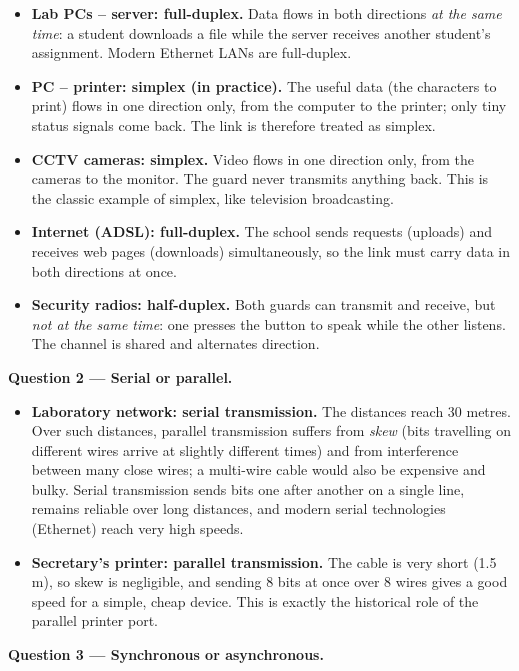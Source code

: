 \documentclass[11pt]{article}
\begin{document}
\begin{itemize}
\item \textbf{Lab PCs -- server: full-duplex.} Data flows in both directions \emph{at the same time}: a student downloads a file while the server receives another student's assignment. Modern Ethernet LANs are full-duplex.
\item \textbf{PC -- printer: simplex (in practice).} The useful data (the characters to print) flows in one direction only, from the computer to the printer; only tiny status signals come back. The link is therefore treated as simplex.
\item \textbf{CCTV cameras: simplex.} Video flows in one direction only, from the cameras to the monitor. The guard never transmits anything back. This is the classic example of simplex, like television broadcasting.
\item \textbf{Internet (ADSL): full-duplex.} The school sends requests (uploads) and receives web pages (downloads) simultaneously, so the link must carry data in both directions at once.
\item \textbf{Security radios: half-duplex.} Both guards can transmit and receive, but \emph{not at the same time}: one presses the button to speak while the other listens. The channel is shared and alternates direction.
\end{itemize}

\textbf{Question 2 — Serial or parallel.}

\begin{itemize}
\item \textbf{Laboratory network: serial transmission.} The distances reach 30 metres. Over such distances, parallel transmission suffers from \emph{skew} (bits travelling on different wires arrive at slightly different times) and from interference between many close wires; a multi-wire cable would also be expensive and bulky. Serial transmission sends bits one after another on a single line, remains reliable over long distances, and modern serial technologies (Ethernet) reach very high speeds.
\item \textbf{Secretary's printer: parallel transmission.} The cable is very short (1.5 m), so skew is negligible, and sending 8 bits at once over 8 wires gives a good speed for a simple, cheap device. This is exactly the historical role of the parallel printer port.
\end{itemize}

\textbf{Question 3 — Synchronous or asynchronous.}
\end{document}
